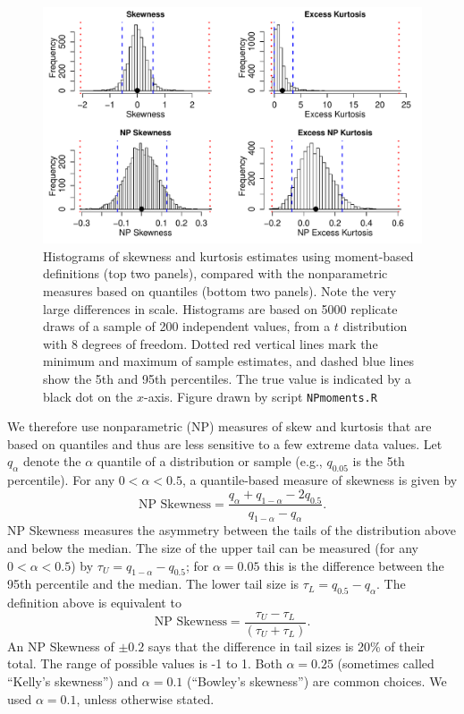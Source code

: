 \documentclass[12pt]{article}
\newcounter{box}
\newcommand{\be}{\begin{equation}}
\newcommand{\ee}{\end{equation}}
\begin{document}
\begin{figure}[tbp]
\centering
\includegraphics[width=\textwidth]{figures/NPmoments.pdf}
\caption{Histograms of skewness and kurtosis estimates using moment-based definitions (top two panels), compared with the nonparametric measures based on quantiles (bottom two panels). 
Note the very large differences in scale. Histograms are based on 5000 replicate draws 
of a sample of 200 independent values, from a $t$ distribution with 8 degrees of freedom. 
Dotted red vertical lines mark the minimum and maximum of sample estimates, and dashed blue lines show the 5th and 95th percentiles. 
The true value is indicated by a black dot on the $x$-axis.
Figure drawn by script \texttt{NPmoments.R}}
\label{fig:NPmoments}
\end{figure} 

We therefore use nonparametric (NP) measures of skew and kurtosis that are based on quantiles and thus are less sensitive to a few extreme data values. 
Let $q_\alpha$ denote the $\alpha$ quantile of a distribution or sample (e.g., $q_{0.05}$ is the 5th percentile). 
For any $0 < \alpha < 0.5$, a quantile-based measure of skewness is given by \citep{mcgillivray-1986}
\be
\mbox{NP Skewness} = \frac{q_\alpha + q_{1-\alpha} - 2 q_{0.5}}{q_{1-\alpha} - q_\alpha}.
\ee
NP Skewness measures the asymmetry between the tails of the distribution above and below the median. 
The size of the upper tail can be measured (for any $0 < \alpha < 0.5$) by $\tau_U = q_{1-\alpha} - q_{0.5}$; for $\alpha=0.05$ this is the difference
between the 95th percentile and the median. 
The lower tail size is $\tau_L = q_{0.5} - q_\alpha$. The definition above is equivalent to  
\be
\mbox{NP Skewness} = \frac{\tau_U - \tau_L}{(\tau_U + \tau_L)}.
\label{eqn:NPskew}
\ee
An NP Skewness of $\pm 0.2$ says that the difference in tail sizes is 20\% of their total. 
The range of possible values is -1 to 1. Both $\alpha=0.25$ (sometimes called ``Kelly's skewness'') and $\alpha=0.1$ (``Bowley's skewness'') are common choices. 
We used $\alpha=0.1$, unless otherwise stated.  
 
\end{document}
